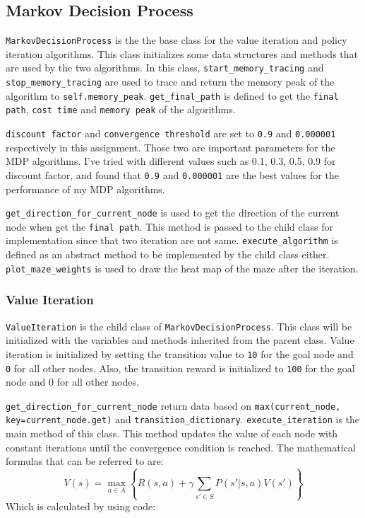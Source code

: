 \documentclass{article}
\begin{document}
\subsection{Markov Decision Process}
\texttt{MarkovDecisionProcess} is the the base class for the value iteration and policy iteration algorithms. 
This class initializes some data structures and methods that are used by the two algorithms. 
In this class, \texttt{start\_memory\_tracing} and \texttt{stop\_memory\_tracing} are used to trace and return the memory peak of the algorithm to \texttt{self.memory\_peak}. 
\texttt{get\_final\_path} is defined to get the \texttt{final path}, \texttt{cost time} and \texttt{memory peak} of the algorithms. 

\texttt{discount factor} and \texttt{convergence threshold} are set to \texttt{0.9} and \texttt{0.000001} respectively in this assignment.
Those two are important parameters for the MDP algorithms. I've tried with different values such as 0.1, 0.3, 0.5, 0.9 for discount factor, and found that \texttt{0.9} and \texttt{0.000001} are the best values for the performance of my MDP algorithms.

\texttt{get\_direction\_for\_current\_node} is used to get the direction of the current node when get the \texttt{final path}. This method is passed to the child class for implementation since that two iteration are not same.
\texttt{execute\_algorithm} is defined as an abstract method to be implemented by the child class either. 
\texttt{plot\_maze\_weights} is used to draw the heat map of the maze after the iteration.

\subsubsection{Value Iteration}
\texttt{ValueIteration} is the child class of \texttt{MarkovDecisionProcess}.
This class will be initialized with the variables and methods inherited from the parent class.
Value iteration is initialized by setting the transition value to \texttt{10} for the goal node and \texttt{0} for all other nodes.
Also, the transition reward is initialized to \texttt{100} for the goal node and 0 for all other nodes.

\texttt{get\_direction\_for\_current\_node} return data based on \texttt{max(current\_node, key=current\_node.get)} and \texttt{transition\_dictionary}.
\texttt{execute\_iteration} is the main method of this class. 
This method updates the value of each node with constant iterations until the convergence condition is reached. 
The mathematical formulas that can be referred to are:
\[ V(s) = \max_{a \in A} \left\{ R(s, a) + \gamma \sum_{s' \in S} P(s'|s, a) V(s') \right\} \]
Which is calculated by using code:
\end{document}
